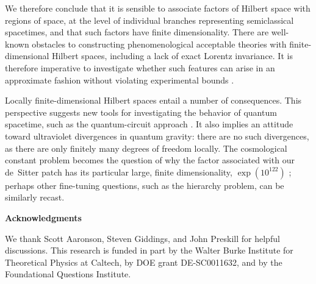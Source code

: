 \documentclass[12pt,english]{article}
\begin{document}
We therefore conclude that it is sensible to associate factors of Hilbert space with regions of space, at the level of individual branches representing semiclassical spacetimes, and that such factors have finite dimensionality.
There are well-known obstacles to constructing phenomenological acceptable theories with finite-dimensional Hilbert spaces, including a lack of exact Lorentz invariance.
It is therefore imperative to investigate whether such features can arise in an approximate fashion without violating experimental bounds \cite{mattingly2005}.

Locally finite-dimensional Hilbert spaces entail a number of consequences.
This perspective suggests new tools for investigating the behavior of quantum spacetime, such as the quantum-circuit approach \cite{bao_etal2017}.
It also implies an attitude toward ultraviolet divergences in quantum gravity: there are no such divergences, as there are only finitely many degrees of freedom locally.
The cosmological constant problem becomes the question of why the factor associated with our de~Sitter patch has its particular large, finite dimensionality, $\exp(10^{122})$ \cite{Banks:2000fe}; perhaps other fine-tuning questions, such as the hierarchy problem, can be similarly recast.






\begin{center} 
 {\bf Acknowledgments}
 \end{center}

We thank Scott Aaronson, Steven Giddings, and John Preskill for helpful discussions. This research is funded in part by the Walter Burke Institute for Theoretical Physics at Caltech, by DOE grant DE-SC0011632, and by the Foundational Questions Institute.



\end{document}
